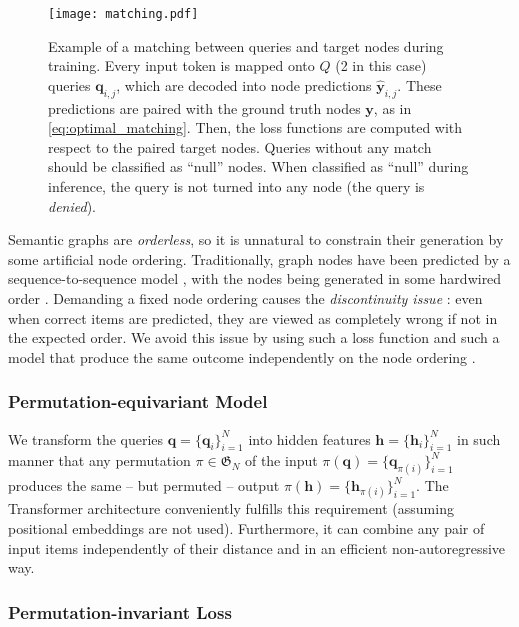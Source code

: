 \documentclass[11pt,a4paper]{article}
\begin{document}
\begin{figure*}[t]
\centering
\texttt{[image: matching.pdf]}
\caption{Example of a matching between queries and target nodes during training. Every input token is mapped onto $Q$ (2 in this case) queries $\mathbf{q}_{i,j}$, which are decoded into node predictions $\hat{\mathbf{y}}_{i,j}$. These predictions are paired with the ground truth nodes $\mathbf{y}$, as in \autoref{eq:optimal_matching}. Then, the loss functions are computed with respect to the paired target nodes. Queries without any match should be classified as ``null'' nodes. When classified as ``null'' during inference, the query is not turned into any node (the query is \emph{denied}).}
\label{fig:matching}
\end{figure*}

Semantic graphs are \emph{orderless}, so it is unnatural to constrain their generation by some artificial node ordering. Traditionally, graph nodes have been predicted by a sequence-to-sequence model \cite{peng2017addressing}, with the nodes being generated in some hardwired order \cite{zhang2019amr}. Demanding a fixed node ordering causes the \emph{discontinuity issue} \cite{zhang2019deep}: even when correct items are predicted, they are viewed as completely wrong if not in the expected order. We avoid this issue by using such a loss function and such a model that produce the same outcome independently on the node ordering \cite{zaheer2017deep}. 

\subsubsection{Permutation-equivariant Model}

We transform the queries $\textbf{q} = \{\textbf{q}_i\}_{i=1}^N$ into hidden features $\textbf{h} = \{\textbf{h}_i\}_{i=1}^N$ in such manner that any permutation $\pi \in \mathfrak{G}_N$ of the input $\pi(\textbf{q}) = \{\textbf{q}_{\pi(i)}\}_{i=1}^N$ produces the same -- but permuted -- output
$\pi(\textbf{h}) = \{\textbf{h}_{\pi(i)}\}_{i=1}^N$. The Transformer architecture \cite{vaswani2017attention} conveniently fulfills this requirement (assuming positional embeddings are not used). Furthermore, it can combine any pair of input items independently of their distance and in an efficient non-autoregressive way.

\subsubsection{Permutation-invariant Loss}
\label{sec:pi_loss}
\end{document}
